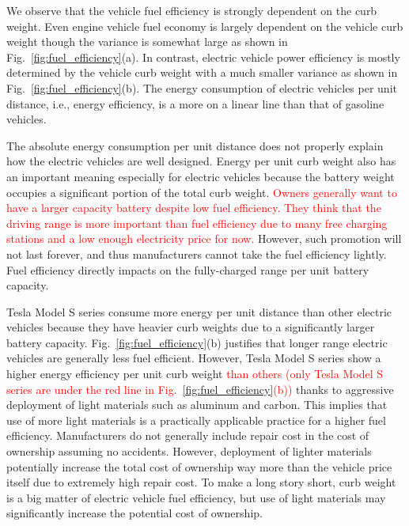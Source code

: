 \documentclass[journal]{IEEEtran}
\begin{document}
We observe that the vehicle fuel efficiency is strongly dependent on the curb weight. 
Even engine vehicle fuel economy is largely dependent on the vehicle curb weight though the variance is somewhat large as shown in Fig.~\ref{fig:fuel_efficiency}(a). In contrast, electric vehicle power efficiency is mostly determined by the vehicle curb weight with a much smaller variance as shown in Fig.~\ref{fig:fuel_efficiency}(b). The energy consumption of electric vehicles per unit distance, i.e., energy efficiency, is a more on a linear line than that of gasoline vehicles.  

The absolute energy consumption per unit distance does not properly explain how the electric vehicles are well designed. 
Energy per unit curb weight also has an important meaning especially for electric vehicles because the battery weight occupies a significant portion of the total curb weight. 
\textcolor{red}{Owners generally want to have a larger capacity battery despite low fuel efficiency. They think that the driving range is more important than fuel efficiency due to many free charging stations and a low enough electricity price for now.}
However, such promotion will not last forever, and thus manufacturers cannot take the fuel efficiency lightly. Fuel efficiency directly impacts on the fully-charged range per unit battery capacity. 

Tesla Model S series consume more energy per unit distance than other electric vehicles because they have heavier curb weights due to a significantly larger battery capacity. Fig.~\ref{fig:fuel_efficiency}(b) justifies that longer range electric vehicles are generally less fuel efficient. However, Tesla Model S series show a higher energy efficiency per unit curb weight \textcolor{red}{than others (only Tesla Model S series are under the red line in Fig.~\ref{fig:fuel_efficiency}(b))} thanks to aggressive deployment of light materials such as aluminum and carbon.  
This implies that use of more light materials is a practically applicable practice for a higher fuel efficiency. Manufacturers do not generally include repair cost in the cost of ownership assuming no accidents. However, deployment of lighter materials potentially increase the total cost of ownership way more than the vehicle price itself due to extremely high repair cost. %
To make a long story short, curb weight is a big matter of electric vehicle fuel efficiency, but use of light materials may significantly increase the potential cost of ownership.
\end{document}
